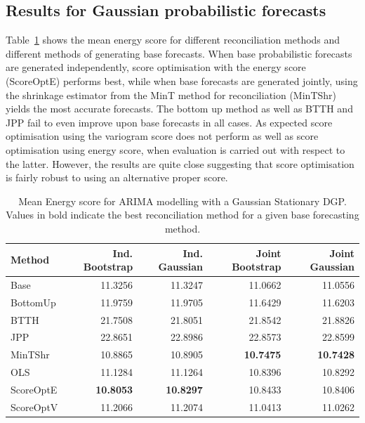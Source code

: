 \documentclass[12pt]{article}
\theoremstyle{definition}
\begin{document}
\subsection{Results for Gaussian probabilistic forecasts}\label{sec:SimAnalysticalResults}

Table~\ref{tab:gse} shows the mean energy score for different reconciliation methods and different methods of generating base forecasts.  When base probabilistic forecasts are generated independently, score optimisation with the energy score (ScoreOptE) performs best, while when base forecasts are generated jointly, using the shrinkage estimator from the MinT method for reconciliation  (MinTShr) yields the most accurate forecasts.  The bottom up method as well as BTTH and JPP fail to even improve upon base forecasts in all cases.  As expected score optimisation using the variogram score does not perform as well as score optimisation using energy score, when evaluation is carried out with respect to the latter.  However, the results are quite close suggesting that score optimisation is fairly robust to using an alternative proper score.

\begin{table}[H]
	\caption{\label{tab:gse}Mean Energy score for ARIMA 
		modelling with a Gaussian Stationary DGP.  Values in bold indicate the best reconciliation method for a given base forecasting method.}
	\centering
	\begin{tabular}[t]{l|r|r|r|r}
		\hline
		Method & Ind. Bootstrap & Ind. Gaussian & Joint Bootstrap & Joint Gaussian\\
		\hline
		Base & 11.3256 & 11.3247 & 11.0662 & 11.0556\\
		\hline
		BottomUp & 11.9759 & 11.9705 & 11.6429 & 11.6203\\
		\hline
		BTTH & 21.7508 & 21.8051 & 21.8542 & 21.8826\\
		\hline
		JPP & 22.8651 & 22.8986 & 22.8573 & 22.8599\\
		\hline
		MinTShr & 10.8865 & 10.8905 & \textbf{10.7475} & \textbf{10.7428}\\
		\hline
		OLS & 11.1284 & 11.1264 & 10.8396 & 10.8292\\
		\hline
		ScoreOptE & \textbf{10.8053} & \textbf{10.8297} & 10.8433 & 10.8406\\
		\hline
		ScoreOptV & 11.2066 & 11.2074 & 11.0413 & 11.0262\\
		\hline
	\end{tabular}
\end{table}
\end{document}
